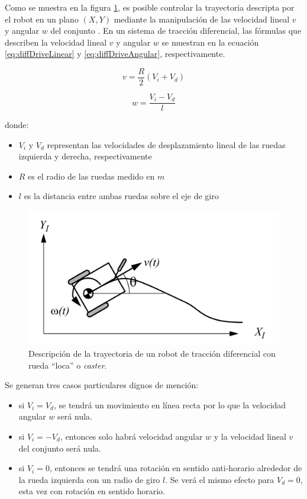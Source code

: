 Como se muestra en la figura \ref{fig:diffDrive}, es posible controlar la trayectoria descripta por el robot en un plano $(X,Y)$ mediante la manipulación de las velocidad lineal $v$ y angular $w$ del conjunto \citep{BOOK:3}. En un sistema de tracción diferencial, las fórmulas que describen la velocidad lineal $v$ y angular $w$ se muestran en la ecuación \ref{eq:diffDriveLinear} y \ref{eq:diffDriveAngular}, respectivamente.

\begin{equation}
    \label{eq:diffDriveLinear}
    v = \frac{R}{2} (V_i + V_d)
\end{equation}

\begin{equation}
    \label{eq:diffDriveAngular}
    w = \frac{V_i - V_d}{l}
\end{equation}

donde:
\begin{itemize}
    \item $V_i$ y $V_d$ representan las velocidades de desplazamiento lineal de las ruedas izquierda y derecha, respectivamente 
    \item $R$ es el radio de las ruedas medido en $m$
    \item $l$ es la distancia entre ambas ruedas sobre el eje de giro
\end{itemize}

\begin{figure}[ht]
    \centering
    \includegraphics[scale=0.9]{./Figures/diff_drive.png}
    \caption{Descripción de la trayectoria de un robot de tracción diferencial con rueda ``loca'' o \textit{caster}.}
    \label{fig:diffDrive}
\end{figure}

Se generan tres casos particulares dignos de mención:
\begin{itemize}
    \item si $V_i = V_d$, se tendrá un movimiento en línea recta por lo que la velocidad angular $w$ será nula.
    \item si $V_i = - V_d$, entonces solo habrá velocidad angular $w$ y la velocidad lineal $v$ del conjunto será nula.
    \item si $V_i = 0$, entonces se tendrá una rotación en sentido anti-horario alrededor de la rueda izquierda con un radio de giro $l$. Se verá el mismo efecto para $V_d = 0$, esta vez con rotación en sentido horario.
\end{itemize}

